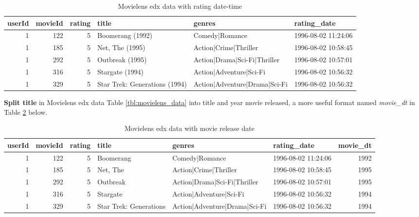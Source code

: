 \documentclass[
]{article}
\begin{document}
\begin{table}[H]

\caption{\label{tab:dw_1}Movielens edx data with rating date-time\label{tbl:movielens_edx_data_rating_date}}
\centering
\fontsize{8}{10}\selectfont
\begin{tabular}[t]{rrrlll}
\toprule
userId & movieId & rating & title & genres & rating\_date\\
\midrule
1 & 122 & 5 & Boomerang (1992) & Comedy|Romance & 1996-08-02 11:24:06\\
1 & 185 & 5 & Net, The (1995) & Action|Crime|Thriller & 1996-08-02 10:58:45\\
1 & 292 & 5 & Outbreak (1995) & Action|Drama|Sci-Fi|Thriller & 1996-08-02 10:57:01\\
1 & 316 & 5 & Stargate (1994) & Action|Adventure|Sci-Fi & 1996-08-02 10:56:32\\
1 & 329 & 5 & Star Trek: Generations (1994) & Action|Adventure|Drama|Sci-Fi & 1996-08-02 10:56:32\\
\bottomrule
\end{tabular}
\end{table}

\textbf{Split title} in Movielens edx data Table
\ref{tbl:movielens_data} into title and year movie released, a more
useful format named \emph{movie\_dt} in Table
\ref{tbl:movielens_edx_movie_release_date} below.

\begin{table}[H]

\caption{\label{tab:dw_2}Movielens edx data with movie release date\label{tbl:movielens_edx_movie_release_date}}
\centering
\fontsize{8}{10}\selectfont
\begin{tabular}[t]{rrrlllr}
\toprule
userId & movieId & rating & title & genres & rating\_date & movie\_dt\\
\midrule
1 & 122 & 5 & Boomerang & Comedy|Romance & 1996-08-02 11:24:06 & 1992\\
1 & 185 & 5 & Net, The & Action|Crime|Thriller & 1996-08-02 10:58:45 & 1995\\
1 & 292 & 5 & Outbreak & Action|Drama|Sci-Fi|Thriller & 1996-08-02 10:57:01 & 1995\\
1 & 316 & 5 & Stargate & Action|Adventure|Sci-Fi & 1996-08-02 10:56:32 & 1994\\
1 & 329 & 5 & Star Trek: Generations & Action|Adventure|Drama|Sci-Fi & 1996-08-02 10:56:32 & 1994\\
\bottomrule
\end{tabular}
\end{table}
\end{document}
